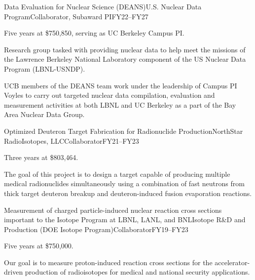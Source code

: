 
\begin{rSubsection}{Data Evaluation for Nuclear Science (DEANS)}{\textnormal{U.S. Nuclear Data Program}}{Collaborator, Subaward PI}{FY22--FY27}
\item    Five years at \$750,850, serving as UC Berkeley Campus PI.
\item Research group tasked with providing nuclear data to help meet the missions of the Lawrence Berkeley National Laboratory component of the US Nuclear Data Program (LBNL-USNDP). 
\item UCB members of the DEANS team work under the leadership of Campus PI Voyles to carry out targeted nuclear
data compilation, evaluation and measurement activities at both LBNL and UC Berkeley as a part of the Bay Area Nuclear Data Group. 


\end{rSubsection}



\begin{rSubsection}{Optimized Deuteron Target Fabrication for Radionuclide Production}{\textnormal{NorthStar RadioIsotopes, LLC}}{Collaborator}{FY21--FY23}
\item    Three years at \$803,464.
\item The goal of this project is to design a target capable of producing multiple medical radionuclides simultaneously using a combination of fast neutrons from thick target deuteron breakup and deuteron-induced fusion evaporation reactions.

\end{rSubsection}

\begin{rSubsection}{Measurement of charged particle-induced nuclear
reaction cross sections important to the Isotope Program at LBNL, LANL, and BNL}{\textnormal{Isotope R\&D and Production (DOE Isotope Program)}}{Collaborator}{FY19--FY23}
\item    Five years at \$750,000.
\item Our goal is to measure proton-induced reaction cross sections for the accelerator-driven production of radioisotopes for medical and national security applications.

\end{rSubsection}


